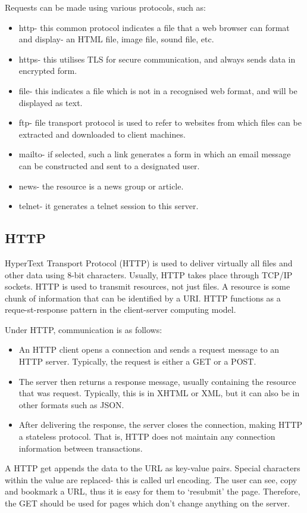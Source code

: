 \documentclass[a4paper, openany]{memoir}
\begin{document}
Requests can be made using various protocols, such as:
\begin{itemize}
    \item http- this common protocol indicates a file that a web browser can format and display- an HTML file, image file, sound file, etc.
    \item https- this utilises TLS for secure communication, and always sends data in encrypted form.
    \item file- this indicates a file which is not in a recognised web format, and will be displayed as text.
    \item ftp- file transport protocol is used to refer to websites from which files can be extracted and downloaded to client machines.
    \item mailto- if selected, such a link generates a form in which an email message can be constructed and sent to a designated user.
    \item news- the resource is a news group or article.
    \item telnet- it generates a telnet session to this server.
\end{itemize}

\subsection{HTTP}
HyperText Transport Protocol (HTTP) is used to deliver virtually all files and other data using 8-bit characters. Usually, HTTP takes place through TCP/IP sockets. HTTP is used to transmit resources, not just files. A resource is some chunk of information that can be identified by a URI. HTTP functions as a reque-st-response pattern in the client-server computing model.

Under HTTP, communication is as follows:
\begin{itemize}
    \item An HTTP client opens a connection and sends a request message to an HTTP server. Typically, the request is either a GET or a POST.
    \item The server then returns a response message, usually containing the resource that was request. Typically, this is in XHTML or XML, but it can also be in other formats such as JSON.
    \item After delivering the response, the server closes the connection, making HTTP a stateless protocol. That is, HTTP does not maintain any connection information between transactions.
\end{itemize}
A HTTP get appends the data to the URL as key-value pairs. Special characters within the value are replaced- this is called url encoding. The user can see, copy and bookmark a URL, thus it is easy for them to `resubmit' the page. Therefore, the GET should be used for pages which don't change anything on the server.
\end{document}
